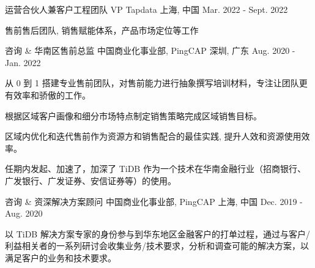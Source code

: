 

\begin{cventries}
\cventry
{运营合伙人兼客户工程团队 VP} %
{Tapdata} %
{上海, 中国} %
{Mar. 2022 - Sept. 2022} %
{
  \begin{cvitems} %
    \item {售前售后团队, 销售赋能体系，产品市场定位等工作}
  \end{cvitems}
}

  \cventry
    {咨询 \& 华南区售前总监} %
    {中国商业化事业部, PingCAP} %
    {深圳, 广东} %
    {Aug. 2020 - Jan. 2022} %
    {
      \begin{cvitems} %
        \item {从 0 到 1 搭建专业售前团队，对售前能力进行抽象撰写培训材料，专注让团队更有效率和骄傲的工作。}
        \item {根据区域客户画像和细分市场特点制定销售策略完成区域销售目标。}
        \item {区域内优化和迭代售前作为资源方和销售配合的最佳实践, 提升人效和资源使用效率。}
      	\item {任期内发起、加速了，加深了 TiDB 作为一个技术在华南金融行业（招商银行、广发银行、广发证券、安信证券等）的使用。}
      \end{cvitems}
    }

  \cventry
    {咨询 \& 资深解决方案顾问 } %
    {中国商业化事业部, PingCAP} %
    {上海, 中国} %
    {Dec. 2019 - Aug. 2020} %
    {
      \begin{cvitems} %
        \item {以 TiDB 解决方案专家的身份参与到华东地区金融客户的打单过程，通过与客户/利益相关者的一系列研讨会收集业务/技术要求，分析和调查可能的解决方案，以满足客户的业务和技术要求。}
      \end{cvitems}
    }


\end{cventries}
